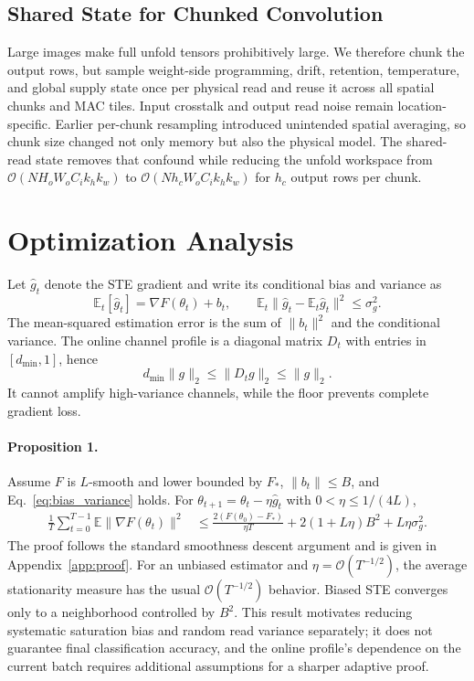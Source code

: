 \documentclass[10pt,twocolumn,letterpaper]{article}
\newcommand{\E}{\mathbb{E}}
\begin{document}
\subsection{Shared State for Chunked Convolution}
\label{sec:shared_read}

Large images make full unfold tensors prohibitively large.  We therefore chunk
the output rows, but sample weight-side programming, drift, retention,
temperature, and global supply state once per physical read and reuse it across
all spatial chunks and MAC tiles.  Input crosstalk and output read noise remain
location-specific.  Earlier per-chunk resampling introduced unintended spatial
averaging, so chunk size changed not only memory but also the physical model.
The shared-read state removes that confound while reducing the unfold workspace
from $\mathcal{O}(NH_oW_oC_ik_hk_w)$ to
$\mathcal{O}(Nh_cW_oC_ik_hk_w)$ for $h_c$ output rows per chunk.

\section{Optimization Analysis}
\label{sec:theory}

Let $\widehat g_t$ denote the STE gradient and write its conditional bias and
variance as
\begin{equation}
 \E_t[\widehat g_t]=\nabla F(\theta_t)+b_t,\qquad
 \E_t\|\widehat g_t-\E_t\widehat g_t\|^2\leq\sigma_g^2.
 \label{eq:bias_variance}
\end{equation}
The mean-squared estimation error is the sum of $\|b_t\|^2$ and the conditional
variance.  The online channel profile is a diagonal matrix $D_t$ with entries
in $[d_{\min},1]$, hence
\begin{equation}
 d_{\min}\|g\|_2\leq\|D_tg\|_2\leq\|g\|_2.
 \label{eq:bounded_scale}
\end{equation}
It cannot amplify high-variance channels, while the floor prevents complete
gradient loss.

\paragraph{Proposition 1.}
Assume $F$ is $L$-smooth and lower bounded by $F_*$,
$\|b_t\|\leq B$, and Eq.~\eqref{eq:bias_variance} holds.  For
$\theta_{t+1}=\theta_t-\eta\widehat g_t$ with
$0<\eta\leq1/(4L)$,
\begin{align}
\frac{1}{T}\sum_{t=0}^{T-1}\E\|\nabla F(\theta_t)\|^2
&\leq \frac{2(F(\theta_0)-F_*)}{\eta T}
 +2(1+L\eta)B^2+L\eta\sigma_g^2.
\label{eq:convergence}
\end{align}
The proof follows the standard smoothness descent argument
\citep{bottou2018optimization} and is given in Appendix~\ref{app:proof}.  For an
unbiased estimator and $\eta=\mathcal{O}(T^{-1/2})$, the average stationarity
measure has the usual $\mathcal{O}(T^{-1/2})$ behavior.  Biased STE converges
only to a neighborhood controlled by $B^2$.  This result motivates reducing
systematic saturation bias and random read variance separately; it does not
guarantee final classification accuracy, and the online profile's dependence on
the current batch requires additional assumptions for a sharper adaptive proof.
\end{document}
